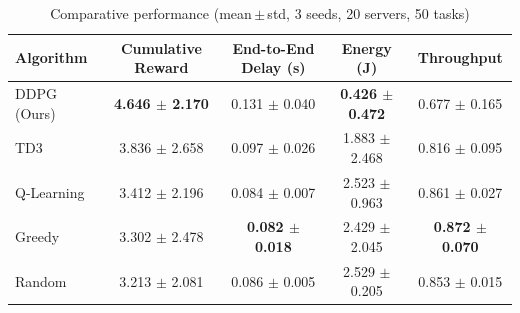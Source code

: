 \begin{table}[ht]
\centering
\caption{Comparative performance (mean\,$\pm$\,std, 3 seeds, 20 servers, 50 tasks)}
\label{tab:results}
\begin{tabular}{lcccc}
\toprule
Algorithm & Cumulative Reward & End-to-End Delay (s) & Energy (J) & Throughput \\
\midrule
DDPG (Ours) & \textbf{4.646 $\pm$ 2.170} & 0.131 $\pm$ 0.040 & \textbf{0.426 $\pm$ 0.472} & 0.677 $\pm$ 0.165 \\
TD3 & 3.836 $\pm$ 2.658 & 0.097 $\pm$ 0.026 & 1.883 $\pm$ 2.468 & 0.816 $\pm$ 0.095 \\
Q-Learning & 3.412 $\pm$ 2.196 & 0.084 $\pm$ 0.007 & 2.523 $\pm$ 0.963 & 0.861 $\pm$ 0.027 \\
Greedy & 3.302 $\pm$ 2.478 & \textbf{0.082 $\pm$ 0.018} & 2.429 $\pm$ 2.045 & \textbf{0.872 $\pm$ 0.070} \\
Random & 3.213 $\pm$ 2.081 & 0.086 $\pm$ 0.005 & 2.529 $\pm$ 0.205 & 0.853 $\pm$ 0.015 \\
\bottomrule
\end{tabular}
\end{table}